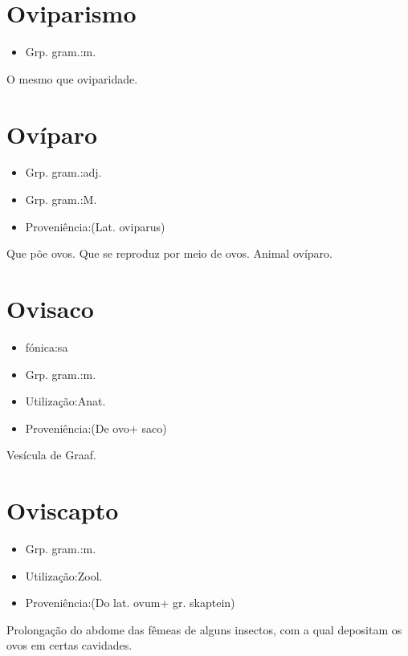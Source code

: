 \section{Oviparismo}
\begin{itemize}
\item {Grp. gram.:m.}
\end{itemize}
O mesmo que \textunderscore oviparidade\textunderscore .
\section{Ovíparo}
\begin{itemize}
\item {Grp. gram.:adj.}
\end{itemize}
\begin{itemize}
\item {Grp. gram.:M.}
\end{itemize}
\begin{itemize}
\item {Proveniência:(Lat. \textunderscore oviparus\textunderscore )}
\end{itemize}
Que põe ovos.
Que se reproduz por meio de ovos.
Animal ovíparo.
\section{Ovisaco}
\begin{itemize}
\item {fónica:sa}
\end{itemize}
\begin{itemize}
\item {Grp. gram.:m.}
\end{itemize}
\begin{itemize}
\item {Utilização:Anat.}
\end{itemize}
\begin{itemize}
\item {Proveniência:(De \textunderscore ovo\textunderscore  + \textunderscore saco\textunderscore )}
\end{itemize}
Vesícula de Graaf.
\section{Oviscapto}
\begin{itemize}
\item {Grp. gram.:m.}
\end{itemize}
\begin{itemize}
\item {Utilização:Zool.}
\end{itemize}
\begin{itemize}
\item {Proveniência:(Do lat. \textunderscore ovum\textunderscore  + gr. \textunderscore skaptein\textunderscore )}
\end{itemize}
Prolongação do abdome das fêmeas de alguns insectos, com a qual depositam os ovos em certas cavidades.
